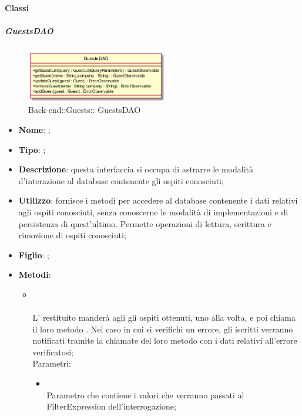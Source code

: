 \paragraph{Classi}
\hypertarget{ GuestsDAO_label}{\subparagraph{ GuestsDAO}}
\begin{figure}[h]
	\centering
	\includegraphics[width=0.55\textwidth,height=\textheight,keepaspectratio]{images/ClassGuestsDAO.png}
	\caption{Back-end::Guests:: GuestsDAO}
\end{figure}
\begin{itemize}
	\item \textbf{Nome}: ;
	\item \textbf{Tipo}: ;
	\item \textbf{Descrizione}: questa interfaccia si occupa di astrarre le modalità d'interazione al database contenente gli ospiti conosciuti;
	\item \textbf{Utilizzo}: fornisce i metodi per accedere al database contenente i dati relativi agli ospiti conosciuti, senza conoscerne le modalità di implementazioni e di persistenza di quest'ultimo. Permette operazioni di lettura, scrittura e rimozione di ospiti conosciuti;
	\item \textbf{Figlio}: ;
	\item \textbf{Metodi}:
	\begin{itemize}
		\item[] \\ \\		L' restituito manderà agli  gli ospiti ottenuti, uno alla volta, e poi chiama il loro metodo . Nel caso in cui si verifichi un errore, gli  iscritti verranno notificati tramite la chiamate del loro metodo  con i dati relativi all'errore verificatosi;\\
		Parametri:
		\begin{itemize}
			\item {} \\
			Parametro che contiene i valori che verranno passati al FilterExpression dell'interrogazione;

\end{itemize}
\end{itemize}
\end{itemize}
